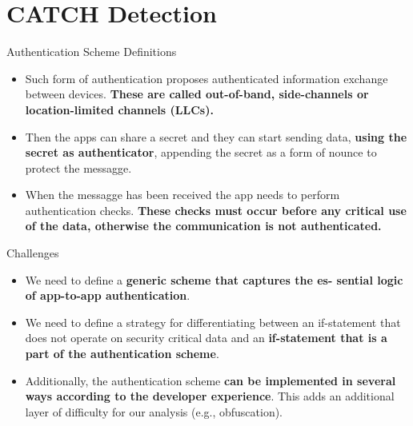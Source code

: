 \documentclass[10pt]{beamer}
\begin{document}
\section{CATCH Detection}

\begin{frame}[fragile]{Authentication Scheme Definitions}

  \begin{itemize}

  \item Such form of authentication proposes authenticated information
    exchange between devices. {\bf These are called out-of-band,
      side-channels or location-limited channels (LLCs).}

  \item Then the apps can share a secret and they can start sending
    data, {\bf using the secret as authenticator}, appending the
    secret as a form of nounce to protect the messagge.

  \item When the messagge has been received the app needs to perform
    authentication checks. {\bf These checks must occur before any
      critical use of the data, otherwise the communication is not
      authenticated.}
      
  \end{itemize}

  
\end{frame}


\begin{frame}[fragile]{Challenges}

  \begin{itemize}

  \item We need to define a {\bf generic scheme that captures the es-
      sential logic of app-to-app authentication}.

  \item We need to define a strategy for differentiating between an
    if-statement that does not operate on security critical data and
    an {\bf if-statement that is a part of the authentication scheme}.

  \item Additionally, the authentication scheme {\bf can be
      implemented in several ways according to the developer
      experience}. This adds an additional layer of difficulty for our
      analysis (e.g., obfuscation).

  \end{itemize}
  
\end{frame}
\end{document}
